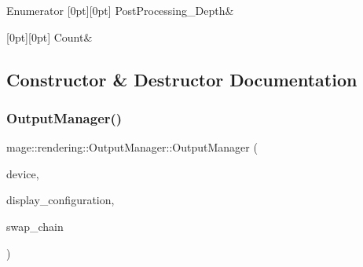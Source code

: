 \begin{DoxyEnumFields}{Enumerator}
[0pt][0pt]{}\hypertarget{classmage_1_1rendering_1_1_output_manager_a71b3797fef957312f92736f15b7ada3ea251bebd0602960f976f4a69dff9b13fe}{}\label{classmage_1_1rendering_1_1_output_manager_a71b3797fef957312f92736f15b7ada3ea251bebd0602960f976f4a69dff9b13fe} 
Post\+Processing\+\_\+\+Depth&\\
\hline

[0pt][0pt]{}\hypertarget{classmage_1_1rendering_1_1_output_manager_a71b3797fef957312f92736f15b7ada3eae93f994f01c537c4e2f7d8528c3eb5e9}{}\label{classmage_1_1rendering_1_1_output_manager_a71b3797fef957312f92736f15b7ada3eae93f994f01c537c4e2f7d8528c3eb5e9} 
Count&\\
\hline

\end{DoxyEnumFields}


\subsection{Constructor \& Destructor Documentation}
\hypertarget{classmage_1_1rendering_1_1_output_manager_a02c97a57bf7217ab65ff5e7a44602200}{}\label{classmage_1_1rendering_1_1_output_manager_a02c97a57bf7217ab65ff5e7a44602200} 
\subsubsection{\texorpdfstring{Output\+Manager()}{OutputManager()}\hspace{0.1cm}{\footnotesize\ttfamily [1/3]}}
{\footnotesize\ttfamily mage\+::rendering\+::\+Output\+Manager\+::\+Output\+Manager (\begin{DoxyParamCaption}\item[{I\+D3\+D11\+Device \&}]{device,  }\item[{\hyperlink{classmage_1_1rendering_1_1_display_configuration}{Display\+Configuration} \&}]{display\+\_\+configuration,  }\item[{\hyperlink{classmage_1_1rendering_1_1_swap_chain}{Swap\+Chain} \&}]{swap\+\_\+chain }\end{DoxyParamCaption})\hspace{0.3cm}{\ttfamily [explicit]}}

